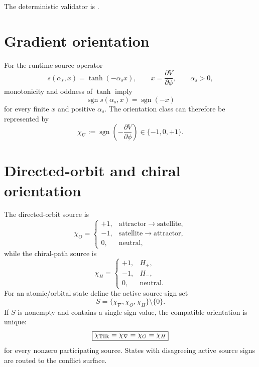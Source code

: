 The deterministic validator is
.

\section{Gradient orientation}
For the runtime source operator
\begin{equation}
s(\alpha_s,x)=\tanh(-\alpha_s x),
\qquad
x=\frac{\partial V}{\partial\phi},
\qquad
\alpha_s>0,
\label{eq:v12-gradient-source}
\end{equation}
monotonicity and oddness of $\tanh$ imply
\begin{equation}
\boxed{
\operatorname{sgn}s(\alpha_s,x)
=\operatorname{sgn}(-x)
}
\label{eq:v12-gradient-sign}
\end{equation}
for every finite $x$ and positive $\alpha_s$. The orientation class can
therefore be represented by
\begin{equation}
\boxed{
\chi_{\nabla}
:=\operatorname{sgn}\!\left(-\frac{\partial V}{\partial\phi}\right)
\in\{-1,0,+1\}.
}
\label{eq:v12-gradient-orientation}
\end{equation}


\section{Directed-orbit and chiral orientation}
The directed-orbit source is
\begin{equation}
\chi_O=
\begin{cases}
+1,&\text{attractor}\to\text{satellite},\\
-1,&\text{satellite}\to\text{attractor},\\
0,&\text{neutral},
\end{cases}
\label{eq:v12-orbit-orientation}
\end{equation}
while the chiral-path source is
\begin{equation}
\chi_H=
\begin{cases}
+1,&H_+,\\
-1,&H_-,\\
0,&\text{neutral}.
\end{cases}
\label{eq:v12-chiral-orientation}
\end{equation}
For an atomic/orbital state define the active source-sign set
\[
S=\{\chi_\nabla,\chi_O,\chi_H\}\setminus\{0\}.
\]
If $S$ is nonempty and contains a single sign value, the compatible orientation
is unique:
\begin{equation}
\boxed{
\chi_{\rm TIR}=\chi_\nabla=\chi_O=\chi_H
}
\label{eq:v12-consensus-orientation}
\end{equation}
for every nonzero participating source. States with disagreeing active source
signs are routed to the conflict surface.

